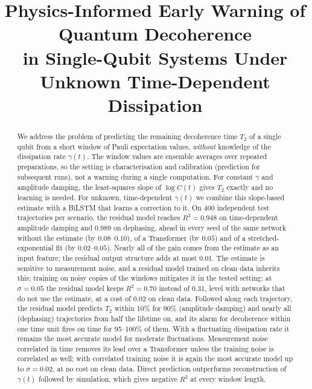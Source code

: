 \documentclass[twocolumn,10pt]{article}
\title{\textbf{Physics-Informed Early Warning of Quantum Decoherence\\
in Single-Qubit Systems Under Unknown Time-Dependent Dissipation}}
\author[1]{}
\affil[1]{\needspaste{confirm this affiliation or replace it}}
\date{}
\begin{document}
\maketitle

\begin{abstract}
We address the problem of predicting the remaining decoherence time $T_2$
of a single qubit from a short window of Pauli expectation values,
\emph{without} knowledge of the dissipation rate $\gamma(t)$.
The window values are ensemble averages over repeated preparations, so
the setting is characterisation and calibration (prediction for subsequent
runs), not a warning during a single computation.
For constant $\gamma$ and amplitude damping, the least-squares slope of
$\log C(t)$ gives $T_2$ exactly and no learning is needed.
For unknown, time-dependent $\gamma(t)$ we combine this slope-based
estimate with a BiLSTM that learns a correction to it.
On 400 independent test trajectories per scenario, the residual model
reaches $R^2 = 0.948$ on time-dependent amplitude damping and $0.989$ on
dephasing, ahead in every seed of the same network without the estimate
(by $0.08$--$0.10$), of a Transformer (by $0.05$) and of a
stretched-exponential fit (by $0.02$--$0.05$).
Nearly all of the gain comes from the estimate as an input feature; the
residual output structure adds at most $0.01$.
The estimate is sensitive to measurement noise, and a residual model
trained on clean data inherits this; training on noisy copies of the
windows mitigates it in the tested setting: at $\sigma = 0.05$ the residual model keeps
$R^2 = 0.70$ instead of $0.31$, level with networks that do not use the
estimate, at a cost of $0.02$ on clean data.
Followed along each trajectory, the residual model predicts $T_2$ within
10\% for 90\% (amplitude damping) and nearly all (dephasing) trajectories
from half the lifetime on, and its alarm for decoherence within one time
unit fires on time for 95--100\% of them.
With a fluctuating dissipation rate it remains the most accurate model
for moderate fluctuations. Measurement noise correlated in time removes
its lead over a Transformer unless the training noise is correlated as
well; with correlated training noise it is again the most accurate model
up to $\sigma = 0.02$, at no cost on clean data.
Direct prediction outperforms
reconstruction of $\gamma(t)$ followed by simulation, which gives negative
$R^2$ at every window length.
\end{abstract}
\end{document}
